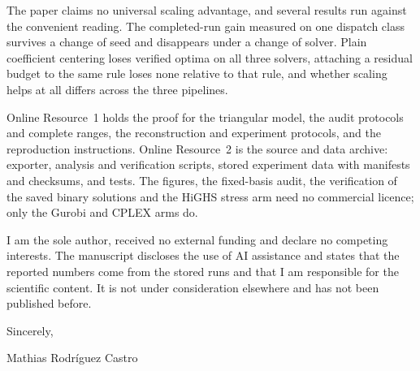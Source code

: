 \documentclass[11pt]{article}
\begin{document}
The paper claims no universal scaling advantage, and several results run against the convenient
reading. The completed-run gain measured on one dispatch class survives a change of seed and
disappears under a change of solver. Plain coefficient centering loses verified optima on all
three solvers, attaching a residual budget to the same rule loses none relative to that rule,
and whether scaling helps at all differs across the three pipelines.

Online Resource~1 holds the proof for the triangular model, the audit protocols and complete
ranges, the reconstruction and experiment protocols, and the reproduction instructions. Online
Resource~2 is the source and data archive: exporter, analysis and verification scripts, stored
experiment data with manifests and checksums, and tests. The figures, the fixed-basis audit, the
verification of the saved binary solutions and the HiGHS stress arm need no commercial licence;
only the Gurobi and CPLEX arms do.

I am the sole author, received no external funding and declare no competing interests. The
manuscript discloses the use of AI assistance and states that the reported numbers come from the
stored runs and that I am responsible for the scientific content. It is not under consideration
elsewhere and has not been published before.

\bigskip
\noindent Sincerely,

\medskip
\noindent Mathias Rodr\'iguez Castro
\end{document}
